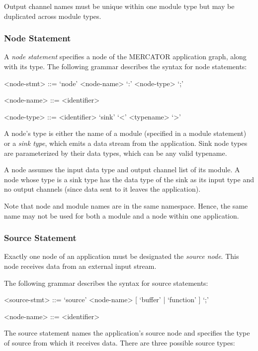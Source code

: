 \documentclass[11pt]{article}
\begin{document}
Output channel names must be unique within one module type but may be
duplicated across module types.


\subsubsection{Node Statement}

A \textit{node statement} specifies a node of the MERCATOR application
graph, along with its type.  The following grammar describes the
syntax for node statements:
\begin{grammar}

<node-stmt> ::= `node' <node-name> `:' <node-type> `;'

<node-name> ::= <identifier>

<node-type> ::= <identifier>
\alt `sink'   `<' <typename> `>'

\end{grammar}

A node's type is either the name of a module (specified in a module
statement) or a \emph{sink type}, which emits a data stream from the
application.  Sink node types are parameterized by their data types,
which can be any valid typename.

A node assumes the input data type and output channel list of its
module.  A node whose type is a sink type has the data type of the
sink as its input type and no output channels (since data sent to it
leaves the application).

Note that node and module names are in the same namespace. Hence, the
same name may not be used for both a module and a node within one
application.

\subsubsection{Source Statement}

Exactly one node of an application must be designated the \emph{source
  node}.  This node receives data from an external input stream. 

The following grammar describes the syntax for source statements:
\begin{grammar}

<source-stmt> ::= `source' <node-name> [ `buffer' | `function' ] `;'

<node-name> ::= <identifier>

\end{grammar}
The source statement names the application's source node and
specifies the type of source from which it receives data.  There are
three possible source types:
\end{document}
